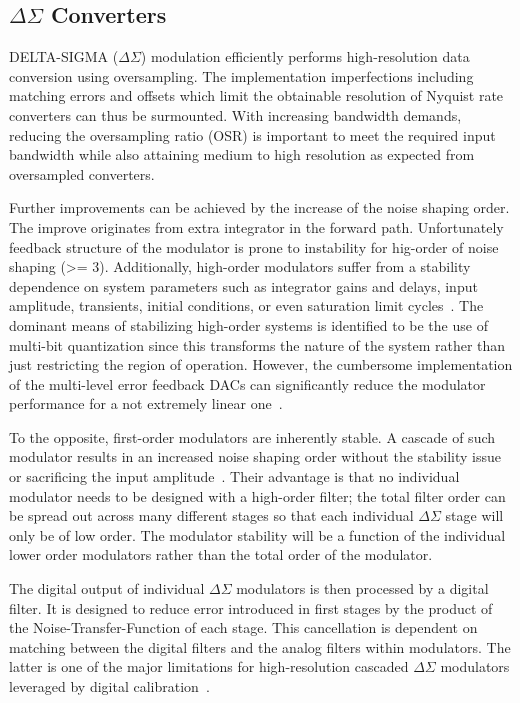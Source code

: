 	\subsection{\(\Delta\Sigma \) Converters}      %
	\label{sec:sd-isd-adc}
DELTA-SIGMA (\(\Delta\Sigma \)) modulation efficiently performs high-resolution data conversion using oversampling. The	implementation imperfections including matching errors and offsets which limit the obtainable resolution of Nyquist rate converters can thus be surmounted. With increasing bandwidth demands, reducing the oversampling ratio (OSR) is important to meet the required input bandwidth while also attaining medium to high resolution as expected from oversampled converters. 

Further improvements can be achieved by the increase of the noise shaping order. The improve originates from extra integrator in the forward path. Unfortunately feedback structure of the modulator is prone to instability for hig-order of noise shaping (>= 3). Additionally, high-order modulators suffer from a stability dependence on system parameters such as integrator gains and delays, input amplitude, transients, initial conditions, or even saturation limit cycles~\cite{Hein1993,Baird1994,Steven1996}. The dominant means of stabilizing high-order systems is identified to be the use of multi-bit quantization since this transforms the nature of the system rather than just restricting the region of operation. However, the cumbersome implementation of the multi-level error feedback DACs can significantly reduce the modulator performance for a not extremely linear one~\cite{Medeiro1999}. 

To the opposite, first-order modulators are inherently stable. A cascade of such modulator results in an increased noise shaping order without the stability issue or sacrificing the input amplitude~\cite{Brooks1997}. Their advantage is that no individual modulator needs to be designed with a high-order filter; the total filter order can be spread out across many different stages so that each individual \(\Delta\Sigma \) stage will only be of low order. The modulator stability will be a function of the individual lower order modulators rather than the total order of the modulator.

The digital output of individual \(\Delta\Sigma \) modulators is then processed by a digital filter. It is designed to reduce error introduced in first stages by the product of the Noise-Transfer-Function of each stage. This cancellation is dependent on matching between the digital filters and the analog filters within modulators. The latter is one of the major limitations for high-resolution cascaded \(\Delta\Sigma \) modulators leveraged by digital calibration~\cite{Cauwenberghs2000}.

